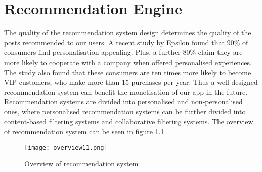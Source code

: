 
\chapter{Recommendation Engine}%
\label{Chapter6} %


The quality of the recommendation system design determines the quality of the posts recommended to our users. 
A recent study by Epsilon found that 90\% of consumers find personalisation appealing. Plus, a further 80\% claim they are more likely to cooperate with a company when offered personalised experiences.
The study also found that these consumers are ten times more likely to become VIP customers, who make more than 15 purchases per year. 
Thus a well-designed recommendation system can benefit the monetisation of our app in the future.
\\Recommendation systems are divided into personalised and non-personalised ones, where personalised recommendation systems can be further divided into content-based filtering systems and collaborative filtering systems. 
The overview of recommendation system can be seen in figure \ref{fig:overrecomm}.
\begin{figure}[ht]
\centering
\texttt{[image: overview11.png]}
\caption{Overview of recommendation system}
\label{fig:overrecomm}
\end{figure}

